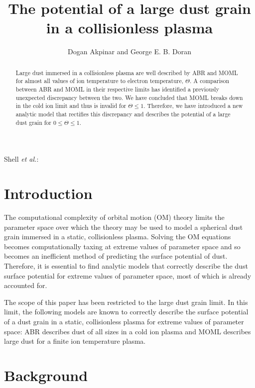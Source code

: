 \documentclass{article}
\begin{document}
\title{The potential of a large dust grain in a collisionless plasma}
\author{Dogan Akpinar and George E. B. Doran}
{Shell \MakeLowercase{\textit{et al.}}:}

\maketitle

\begin{abstract}
    
Large dust immersed in a collisionless plasma are well described 
by ABR and MOML for almost all values of ion temperature to electron temperature, $\Theta$. 
A comparison between ABR and MOML in their respective limits has identified 
a previously unexpected discrepancy between the two. We have concluded that MOML breaks
down in the cold ion limit and thus is invalid for $\Theta \leq 1$. Therefore, we have introduced a new 
analytic model that rectifies this discrepancy and describes the potential 
of a large dust grain for $0 \leq \Theta \leq 1$.

\end{abstract}

\section{Introduction}

The computational complexity of orbital motion (OM) theory limits the parameter 
space over which the theory may be used to model a spherical dust grain immersed in a static, collisionless plasma. 
Solving the OM equations becomes computationally taxing at extreme values of parameter space
and so becomes an inefficient method of predicting the surface potential of dust. 
Therefore, it is essential to find analytic models that correctly describe the dust surface potential for extreme values of parameter space, most of which is already 
accounted for. 

\medskip

The scope of this paper has been restricted to the large dust grain limit. In this limit, the 
following models are known to correctly describe the surface potential 
of a dust grain in a static, collisionless plasma for extreme values of parameter space: 
ABR describes dust of all sizes in a cold ion plasma and MOML describes large dust for a finite ion 
temperature plasma. 
 
\section{Background}
\end{document}
